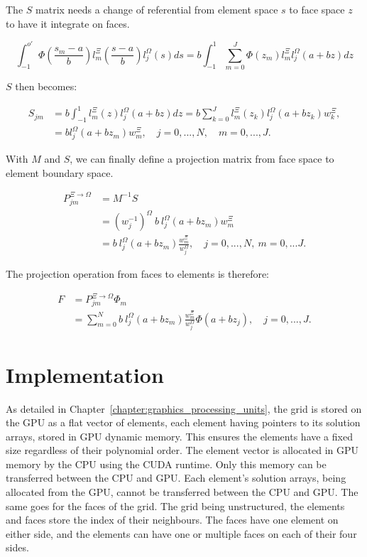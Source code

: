 The $S$ matrix needs a change of referential from element space $s$ to face space $z$ to have it
integrate on faces.

\begin{equation}
	\int_{-1}^{o'} \Phi(\frac{s_m -a}{b})l_m^\Xi(\frac{s -a}{b}) l_j^\Omega(s)ds
	= b\int_{-1}^{1}\sum_{m = 0}^{J} \Phi(z_m)l_m^{\Xi}l_j^{\Omega}(a + bz)dz
\end{equation}

$S$ then becomes: 

\begin{equation}
	\begin{aligned}
		S_{jm} &=  b\int_{-1}^{1}l_m^{\Xi}(z)l_j^{\Omega}(a + bz)dz
		= b\sum_{k = 0}^{J}l_m^{\Xi}(z_k)l_j^{\Omega}(a +b z_k)w_k^{\Xi}, \\
		&= b l_j^{\Omega}(a + bz_m)w_m^{\Xi}, \quad j = 0, ..., N, \quad m = 0, ..., J.
	\end{aligned}
\end{equation}

With $M$ and $S$, we can finally define a projection matrix from face space to element boundary space.

\begin{equation}
	\begin{aligned}
		P^{\Xi \rightarrow \Omega}_{jm} &= M^{-1}S \\
		&= (w_j^{-1})^{\Omega } \: b \: l_j^{\Omega }(a + bz_m)w_m^{\Xi}\\
		&= b \: l_j^{\Omega}(a + bz_m)\frac{w_m^{\Xi}}{w_j^{\Omega}}, \quad j = 0, ..., N, \: m = 0, ... J. 
	\end{aligned}
\end{equation} 

The projection operation from faces to elements is therefore:

\begin{align} \label{projection_face_to_element}
	F &= P^{\Xi \rightarrow \Omega}_{jm} \Phi_m  \\
	&= \sum_{m = 0}^{N} b \: l_j^{\Omega}(a + bz_m)\frac{w_m^{\Xi}}{w_j^{\Omega}} \Phi (a + b z_j), \quad j = 0, ..., J.
\end{align}

\section{Implementation} \label{section:adaptive_mesh_refinement:implementation}

As detailed in Chapter~\ref{chapter:graphics_processing_units}, the grid is stored on the GPU as a
flat vector of elements, each element having pointers to its solution arrays, stored in GPU dynamic
memory. This ensures the elements have a fixed size regardless of their polynomial order. The
element vector is allocated in GPU memory by the CPU using the CUDA runtime. Only this memory can be
transferred between the CPU and GPU. Each element's solution arrays, being allocated from the GPU,
cannot be transferred between the CPU and GPU. The same goes for the faces of the grid. The grid
being unstructured, the elements and faces store the index of their neighbours. The faces have one
element on either side, and the elements can have one or multiple faces on each of their four sides.

